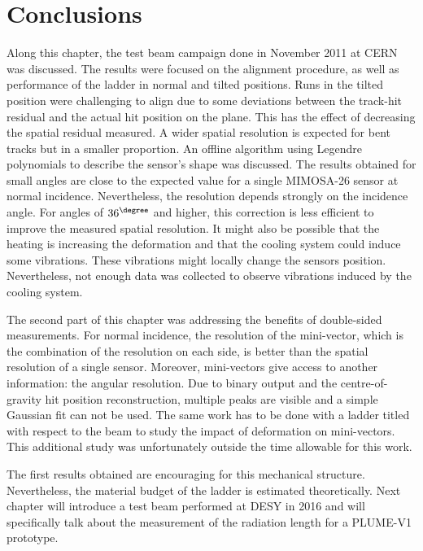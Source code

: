   \section{Conclusions}

  Along this chapter, the test beam campaign done in November 2011 at \gls{CERN} was discussed. 
  The results were focused on the alignment procedure, as well as performance of the ladder in normal and tilted positions.
  Runs in the tilted position were challenging to align due to some deviations between the track-hit residual and the actual hit position on the plane.
  This has the effect of decreasing the spatial residual measured.
  A wider spatial resolution is expected for bent tracks but in a smaller proportion.
  An offline algorithm using Legendre polynomials to describe the sensor's shape was discussed.
  The results obtained for small angles are close to the expected value for a single \gls{MIMOSA}-26 sensor at normal incidence. 
  Nevertheless, the resolution depends strongly on the incidence angle.
  For angles of $36^{\degree}$ and higher, this correction is less efficient to improve the measured spatial resolution.
  It might also be possible that the heating is increasing the deformation and that the cooling system could induce some vibrations.
  These vibrations might locally change the sensors position.
  Nevertheless, not enough data was collected to observe vibrations induced by the cooling system.

  The second part of this chapter was addressing the benefits of double-sided measurements.
  For normal incidence, the resolution of the mini-vector, which is the combination of the resolution on each side, is better than the spatial resolution of a single sensor.
  Moreover, mini-vectors give access to another information: the angular resolution.
  Due to binary output and the centre-of-gravity hit position reconstruction, multiple peaks are visible and a simple Gaussian fit can not be used. 
  The same work has to be done with a ladder titled with respect to the beam to study the impact of deformation on mini-vectors.
  This additional study was unfortunately outside the time allowable for this work.

  The first results obtained are encouraging for this mechanical structure.
  Nevertheless, the material budget of the ladder is estimated theoretically.
  Next chapter will introduce a test beam performed at \gls{DESY} in 2016 and will specifically talk about the measurement of the radiation length for a \gls{PLUME}-V1 prototype.

